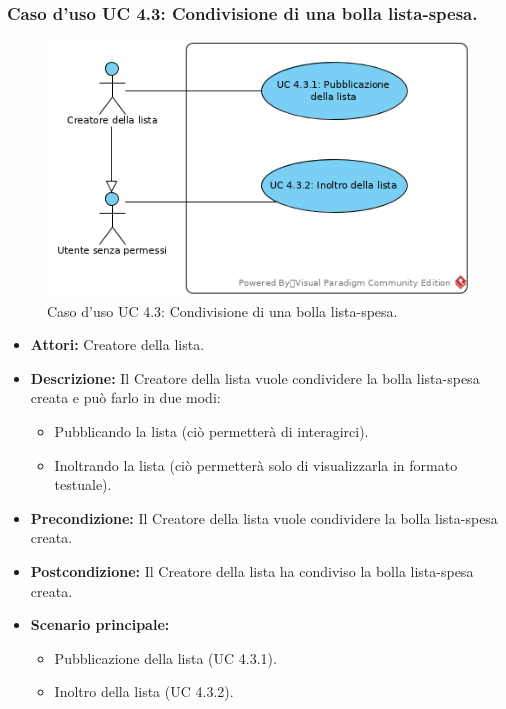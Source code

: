\subsubsection{Caso d'uso UC 4.3: Condivisione di una bolla lista-spesa.}
\label{Caso d'uso UC 4.3: Condivisione di una bolla lista-spesa.}
\begin{figure}[ht]
	\centering
	\includegraphics[scale=0.60]{Usecases/img/UC4.3.png}
	\caption{Caso d'uso UC 4.3: Condivisione di una bolla lista-spesa.}
\end{figure}

\FloatBarrier
\begin{itemize}
\item \textbf{Attori:} Creatore della lista.
\item \textbf{Descrizione:} Il Creatore della lista vuole condividere la bolla lista-spesa creata e può farlo in due modi:
\begin{itemize}
\item{Pubblicando la lista (ciò permetterà di interagirci).}
\item{Inoltrando la lista (ciò permetterà solo di visualizzarla in formato testuale).}
\end{itemize}
\item \textbf{Precondizione:} Il Creatore della lista vuole condividere la bolla lista-spesa creata. 
\item \textbf{Postcondizione:} Il Creatore della lista ha condiviso la bolla lista-spesa creata.
\item \textbf{Scenario principale:}
	\begin{itemize}
	\item{Pubblicazione della lista (UC 4.3.1).}
	\item{Inoltro della lista (UC 4.3.2).}
	\end{itemize}
\end{itemize}